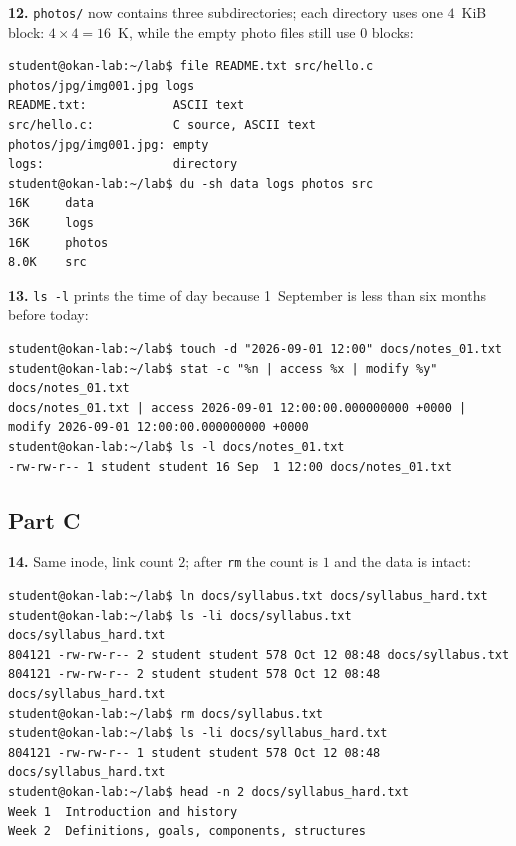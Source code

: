\documentclass[11pt,a4paper]{article}
\newcommand{\cmd}[1]{\texttt{#1}}
\begin{document}
\textbf{12.} \texttt{photos/} now contains three subdirectories; each directory uses one $4$~KiB block: $4 \times 4 = 16$~K, while the empty photo files still use $0$ blocks:
\begin{lstlisting}[style=term,basicstyle=\ttfamily\scriptsize\color{light}]
student@okan-lab:~/lab$ file README.txt src/hello.c photos/jpg/img001.jpg logs
README.txt:            ASCII text
src/hello.c:           C source, ASCII text
photos/jpg/img001.jpg: empty
logs:                  directory
student@okan-lab:~/lab$ du -sh data logs photos src
16K     data
36K     logs
16K     photos
8.0K    src
\end{lstlisting}

\textbf{13.} \cmd{ls -l} prints the time of day because 1~September is less than six months before today:
\begin{lstlisting}[style=term,basicstyle=\ttfamily\scriptsize\color{light}]
student@okan-lab:~/lab$ touch -d "2026-09-01 12:00" docs/notes_01.txt
student@okan-lab:~/lab$ stat -c "%n | access %x | modify %y" docs/notes_01.txt
docs/notes_01.txt | access 2026-09-01 12:00:00.000000000 +0000 | modify 2026-09-01 12:00:00.000000000 +0000
student@okan-lab:~/lab$ ls -l docs/notes_01.txt
-rw-rw-r-- 1 student student 16 Sep  1 12:00 docs/notes_01.txt
\end{lstlisting}

\subsection*{Part C}

\textbf{14.} Same inode, link count $2$; after \cmd{rm} the count is $1$ and the data is intact:
\begin{lstlisting}[style=term,basicstyle=\ttfamily\scriptsize\color{light}]
student@okan-lab:~/lab$ ln docs/syllabus.txt docs/syllabus_hard.txt
student@okan-lab:~/lab$ ls -li docs/syllabus.txt docs/syllabus_hard.txt
804121 -rw-rw-r-- 2 student student 578 Oct 12 08:48 docs/syllabus.txt
804121 -rw-rw-r-- 2 student student 578 Oct 12 08:48 docs/syllabus_hard.txt
student@okan-lab:~/lab$ rm docs/syllabus.txt
student@okan-lab:~/lab$ ls -li docs/syllabus_hard.txt
804121 -rw-rw-r-- 1 student student 578 Oct 12 08:48 docs/syllabus_hard.txt
student@okan-lab:~/lab$ head -n 2 docs/syllabus_hard.txt
Week 1  Introduction and history
Week 2  Definitions, goals, components, structures
\end{lstlisting}
\end{document}
